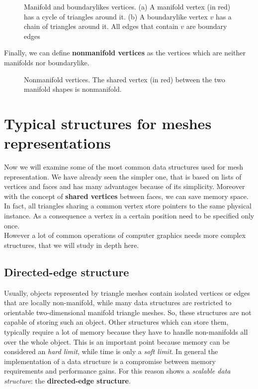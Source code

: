 \begin{figure}[htb] %
   \centering
   
   \caption[Manifold and boundarylikes vertices]{Manifold and boundarylikes vertices. (a) A manifold vertex (in red) has a cycle of triangles around it. (b)  A boundarylike vertex $v$ has a chain of triangles around it. All edges that contain $v$ are boundary edges}
   \label{fig:boundarylike}
\end{figure}

Finally, we can define \textbf{nonmanifold vertices} as the vertices which are neither manifolds nor boundarylike.

\begin{figure}[htb] %
   \centering
   
   \caption[Nonmanifold vertices]{Nonmanifold vertices. The shared vertex (in red) between the two manifold shapes is nonmanifold.}
   \label{fig:nonmanifold}
\end{figure}


\section{Typical structures for meshes representations}\label{sec14:meshStructures}

Now we will examine some of the most common data structures used for mesh representation. We have already seen the simpler one, that is based on lists of vertices and faces and has many advantages because of its simplicity. Moreover with the concept of \textbf{shared vertices} between faces, we can save memory space. In fact, all triangles sharing a common vertex store pointers to the same physical instance. As a consequence a vertex in a certain position need to be specified only once.\\

However a lot of common operations of computer graphics needs more complex structures, that we will study in depth here.

\subsection{Directed-edge structure}

Usually, objects represented by triangle meshes contain isolated vertices or edges that are locally non-manifold, while many data structures are restricted to orientable two-dimensional manifold triangle meshes. So, these structures are not capable of storing such an object. Other structures which can store them, typically require a lot of memory because they have to handle non-manifolds all over the whole object. This is an important point because memory can be considered an \textit{hard limit}, while time is only a \textit{soft limit}. In general the implementation of a data structure is a compromise between memory requirements and performance gains. For this reason \cite{Campagna} shows a \textit{scalable data structure}: the \textbf{directed-edge structure}.\\

